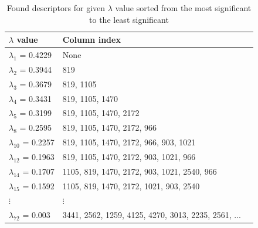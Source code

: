\documentclass[11pt,oneside,czech,american]{book} %
\theoremstyle{plain}
\theoremstyle{definition}
\begin{document}
\begin{table}[H]
	\centering
	\begin{tabular}{lll} 
		\hline
		$\lambda$ value & Column index                                                                \\ 
		\hline
		$\lambda_1$ = 0.4229    & None                                                               \\ 
		
		$\lambda_2$ = 0.3944    & 819                                                         \\ 
		
		$\lambda_3$ = 0.3679    & 819, 1105                                                  \\ 
		
		$\lambda_4$ = 0.3431    & 819, 1105, 1470                                             \\ 
		
		$\lambda_5$ = 0.3199    & 819, 1105, 1470, 2172                                        \\ 
		
		$\lambda_8$  = 0.2595    & 819, 1105, 1470, 2172, 966                                  \\ 
		
		$\lambda_{10}$ = 0.2257    & 819, 1105, 1470, 2172, 966, 903, 1021                             \\ 
		
		$\lambda_{12}$ = 0.1963    & 819, 1105, 1470, 2172, 903, 1021, 966                       \\ 
		
		$\lambda_{14}$ = 0.1707    & 1105, 819, 1470, 2172, 903, 1021, 2540, 966                \\ 
		
		$\lambda_{15}$  = 0.1592    & 1105, 819, 1470, 2172, 1021, 903, 2540        \\ 
		
		$\vdots$  & $\vdots$                                                   \\ 
		
		$\lambda_{72}$ = 0.003     & 3441, 2562, 1259, 4125, 4270, 3013, 2235, 2561, ...         \\
		\hline
	\end{tabular}
	\caption{Found descriptors for given $\lambda$ value sorted from the most significant to the least significant}
	\label{instability}
\end{table}
\end{document}
